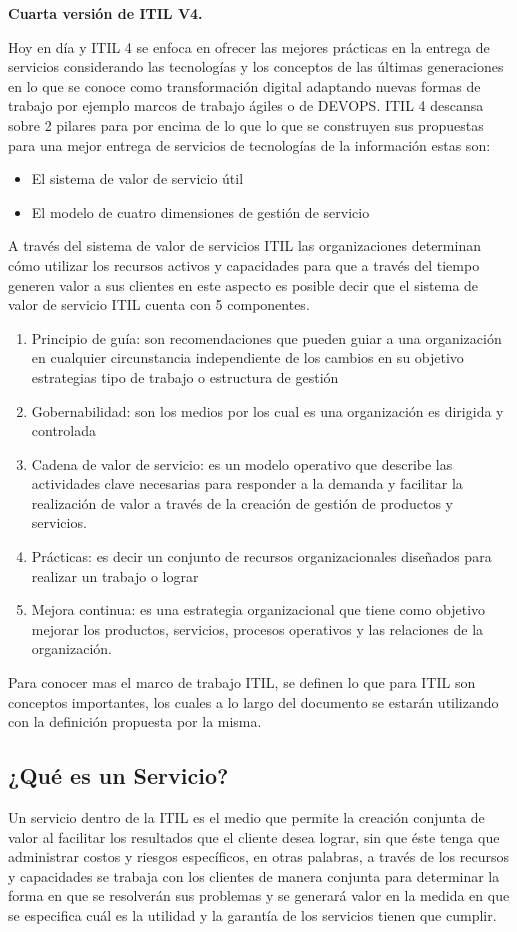 \textbf{Cuarta versión de ITIL V4.}

 Hoy en día y ITIL 4 se enfoca en ofrecer las mejores prácticas en la entrega de servicios considerando las tecnologías y los conceptos de las últimas generaciones en lo que se conoce como transformación digital adaptando nuevas formas de trabajo por ejemplo marcos de trabajo ágiles o de DEVOPS.
 ITIL 4 descansa sobre 2 pilares para por encima de lo que lo que se construyen sus propuestas para una mejor entrega de servicios de tecnologías de la información estas son:
 \begin{itemize}
 	\item El sistema de valor de servicio útil
 	\item	El modelo de cuatro dimensiones de gestión de servicio
 \end{itemize}
 
 A través del sistema de valor de servicios ITIL las organizaciones determinan cómo utilizar los recursos activos y capacidades para que a través del tiempo generen valor a sus clientes en este aspecto es posible decir que el sistema de valor de servicio ITIL cuenta con 5 componentes.
 \begin{enumerate}
 	\item Principio de guía: son recomendaciones que pueden guiar a una organización en cualquier circunstancia independiente de los cambios en su objetivo estrategias tipo de trabajo o estructura de gestión
 	\item	Gobernabilidad:  son los medios por los cual es una organización es dirigida y controlada
 \item Cadena de valor de servicio: es un modelo operativo que describe las actividades clave necesarias para responder a la demanda y facilitar la realización de valor a través de la creación de gestión de productos y servicios.
 	\item	Prácticas: es decir un conjunto de recursos organizacionales diseñados para realizar un trabajo o lograr
 	\item	Mejora continua: es una estrategia organizacional que tiene como objetivo mejorar los productos, servicios, procesos operativos y las relaciones de la organización.
 \end{enumerate}
 
 
 Para conocer mas el marco de trabajo ITIL, se definen lo que para ITIL son conceptos importantes, los  cuales a lo largo del documento se estarán utilizando con la definición propuesta por la misma.
 
 \subsection{¿Qué es un Servicio?}
 Un servicio dentro de la ITIL es el medio que permite la creación conjunta de valor al facilitar los resultados que el cliente desea lograr, sin que éste tenga que administrar costos y riesgos específicos, en otras palabras, a través de los recursos y capacidades se trabaja con los clientes de manera conjunta para determinar la forma en que se resolverán sus problemas y se generará valor en la medida en que se especifica cuál es la utilidad y la garantía de los servicios tienen que cumplir.
